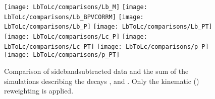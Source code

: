 \begin{figure}[tb]
	\centering
  	\texttt{[image: LbToLc/comparisons/Lb\_M]}
  	\texttt{[image: LbToLc/comparisons/Lb\_BPVCORRM]}
  	\texttt{[image: LbToLc/comparisons/Lb\_P]}
  	\texttt{[image: LbToLc/comparisons/Lb\_PT]}
  	\texttt{[image: LbToLc/comparisons/Lc\_P]}
  	\texttt{[image: LbToLc/comparisons/Lc\_PT]}
  	\texttt{[image: LbToLc/comparisons/p\_P]}
  	\texttt{[image: LbToLc/comparisons/p\_PT]}
	\caption{Comparison of sidebandsubtracted data and the sum of the simulations describing the decays \LcTopKpi,  and . Only the kinematic \pt(\Lb) reweighting is applied.}
    \label{fig:reweight_Lc_app}
\end{figure}

